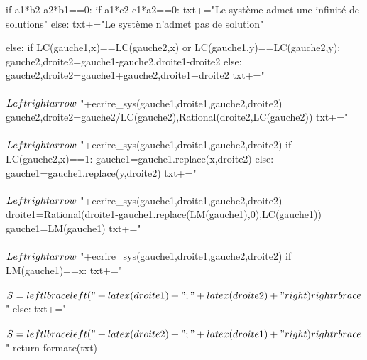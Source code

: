 \begin{pycode}
{    if a1*b2-a2*b1==0:
        if a1*c2-c1*a2==0:
            txt+="Le système admet une infinité de solutions"
        else:
            txt+="Le système n'admet pas de solution"

    else:
        if LC(gauche1,x)==LC(gauche2,x) or LC(gauche1,y)==LC(gauche2,y):
            gauche2,droite2=gauche1-gauche2,droite1-droite2
        else:
            gauche2,droite2=gauche1+gauche2,droite1+droite2
        txt+="\\\\ $ \\Leftrightarrow $ "+ecrire_sys(gauche1,droite1,gauche2,droite2)
        gauche2,droite2=gauche2/LC(gauche2),Rational(droite2,LC(gauche2))
        txt+="\\\\ $ \\Leftrightarrow $ "+ecrire_sys(gauche1,droite1,gauche2,droite2)
        if LC(gauche2,x)==1:
            gauche1=gauche1.replace(x,droite2)
        else:
            gauche1=gauche1.replace(y,droite2)
        txt+="\\\\ $ \\Leftrightarrow $ "+ecrire_sys(gauche1,droite1,gauche2,droite2)
        droite1=Rational(droite1-gauche1.replace(LM(gauche1),0),LC(gauche1))
        gauche1=LM(gauche1)
        txt+="\\\\$ \\Leftrightarrow $ "+ecrire_sys(gauche1,droite1,gauche2,droite2)
        if LM(gauche1)==x:
            txt+="\\\\ $S=\\left\\lbrace \\left("+latex(droite1)+" ; "+latex(droite2)+"\\right) \\right\\rbrace$"
        else:
            txt+="\\\\$S=\\left\\lbrace \\left("+latex(droite2)+" ; "+latex(droite1)+"\\right) \\right\\rbrace$"
    return formate(txt)





}
\end{pycode}
